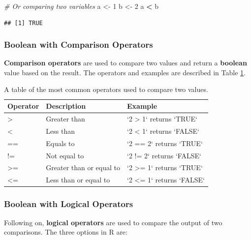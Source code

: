 \documentclass[
]{book}
\newenvironment{Shaded}{\begin{snugshade}}{\end{snugshade}}
\newcommand{\CommentTok}[1]{\textcolor[rgb]{0.56,0.35,0.01}{\textit{#1}}}
\newcommand{\DecValTok}[1]{\textcolor[rgb]{0.00,0.00,0.81}{#1}}
\newcommand{\NormalTok}[1]{#1}
\newcommand{\OtherTok}[1]{\textcolor[rgb]{0.56,0.35,0.01}{#1}}
\newcommand{\SpecialCharTok}[1]{\textcolor[rgb]{0.81,0.36,0.00}{\textbf{#1}}}
\begin{document}
\begin{Shaded}
\begin{Highlighting}[]
\CommentTok{\# Or comparing two variables}
\NormalTok{a }\OtherTok{\textless{}{-}} \DecValTok{1}
\NormalTok{b }\OtherTok{\textless{}{-}} \DecValTok{2}
\NormalTok{a }\SpecialCharTok{\textless{}}\NormalTok{ b}
\end{Highlighting}
\end{Shaded}

\begin{verbatim}
## [1] TRUE
\end{verbatim}

\subsubsection{Boolean with Comparison Operators}\label{boolean-with-comparison-operators}

\textbf{Comparison operators} are used to compare two values and return a \textbf{boolean} value based on the result. The operators and examples are described in Table \ref{tab:operators}.

\begin{table}

\caption{\label{tab:operators}A table of the most common operators used to compare two values.}
\centering
\begin{tabular}[t]{l|l|l}
\hline
Operator & Description & Example\\
\hline
> & Greater than & `2 > 1` returns `TRUE`\\
\hline
< & Less than & `2 < 1` returns `FALSE`\\
\hline
== & Equals to & `2 == 2` returns `TRUE`\\
\hline
!= & Not equal to & `2 != 2` returns `FALSE`\\
\hline
>= & Greater than or equal to & `2 >= 1` returns `TRUE`\\
\hline
<= & Less than or equal to & `2 <= 1` returns `FALSE`\\
\hline
\end{tabular}
\end{table}

\subsubsection{Boolean with Logical Operators}\label{sec:logicalOperators}

Following on, \textbf{logical operators} are used to compare the output of two comparisons. The three options in R are:
\end{document}
